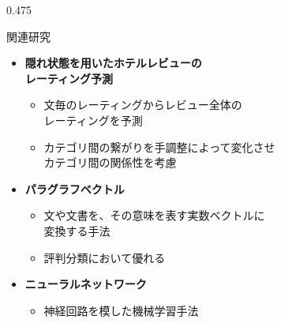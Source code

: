 \documentclass[unicode,10pt]{beamer}
\newcommand{\itemtitle}[1]{\textbf{#1}\\}
\newcommand{\columnsize}{0.475\textwidth}
\begin{document}
\begin{frame}
\begin{columns}[onlytextwidth,t]
\begin{column}{\columnsize}
  \begin{block}{関連研究}
    \begin{itemize}
      \item \itemtitle{隠れ状態を用いたホテルレビューの\\
                       レーティング予測\cite{fujitani15}}
        \begin{itemize}
          \item 文毎のレーティングからレビュー全体の \\
                レーティングを予測
          \item カテゴリ間の繋がりを手調整によって変化させ \\
                カテゴリ間の関係性を考慮
        \end{itemize}
      \item \itemtitle{パラグラフベクトル\cite{quoc14}}
        \begin{itemize}
          \item 文や文書を、その意味を表す実数ベクトルに \\
                変換する手法
          \item 評判分類において優れる
        \end{itemize}
      \item \itemtitle{ニューラルネットワーク}
        \begin{itemize}
          \item 神経回路を模した機械学習手法
        \end{itemize}
    \end{itemize}
  \end{block}


\end{column}
\end{columns}
\end{frame}
\end{document}
